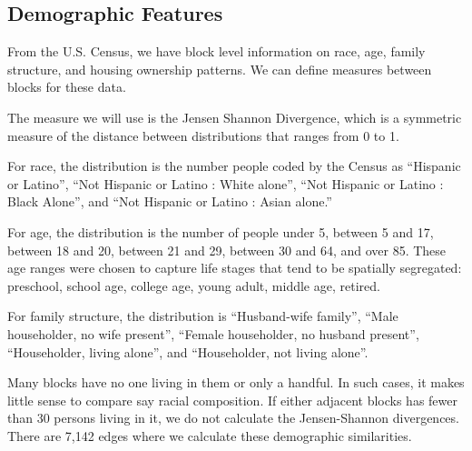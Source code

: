 \documentclass[12pt,letter]{article}\usepackage[]{graphicx}\usepackage[]{color}
\begin{document}
\subsection*{Demographic Features}

From the U.S. Census, we have block level information on race, age,
family structure, and housing ownership patterns. We can define
measures between blocks for these data. 

The measure we will use is the Jensen Shannon Divergence, which is a
symmetric measure of the distance between distributions that ranges from
0 to 1. 

For race, the distribution is the number people coded by the Census as
``Hispanic or Latino'', ``Not Hispanic or Latino : White alone'',
``Not Hispanic or Latino : Black Alone'', and ``Not Hispanic or Latino
: Asian alone.'' 

For age, the distribution is the number of people
under 5, between 5 and 17, between 18 and 20, between 21 and 29,
between 30 and 64, and over 85. These age ranges were chosen to
capture life stages that tend to be spatially segregated: preschool,
school age, college age, young adult, middle age, retired. 

For family structure, the distribution is ``Husband-wife family'',
``Male householder, no wife present'', ``Female householder, no
husband present'', ``Householder, living alone'', and ``Householder,
not living alone''.

Many blocks have no one living in them or only a handful. In such
cases, it makes little sense to compare say racial composition. If
either adjacent blocks has fewer than 30 persons living in it, we do
not calculate the Jensen-Shannon divergences. There are
7,142 edges where we calculate these
demographic similarities.
\end{document}
